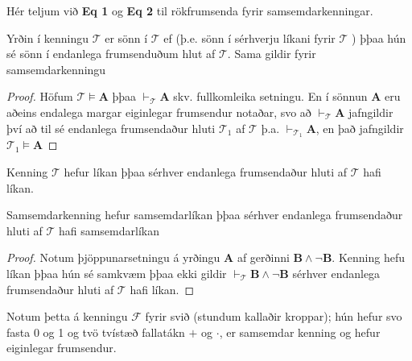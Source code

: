 \documentclass[12pt]{article}
\begin{document}
\begin{ath}
 Hér teljum við \textbf{Eq 1} og \textbf{Eq 2} til rökfrumsenda fyrir
 samsemdarkenningar.
\end{ath}

\begin{setn}[Þjöppunarsetning]
  Yrðin í kenningu $\mathcal{T}$ er sönn í $\mathcal{T}$ ef (þ.e. sönn
  í sérhverju líkani fyrir $\mathcal{T}$ ) þþaa
  hún sé sönn í endanlega frumsenduðum hlut af $\mathcal{T}$.
  Sama gildir fyrir samsemdarkenningu
\end{setn}

\begin{proof}
  Höfum $\mathcal{T} \models \mathbf{A}$ þþaa $\vdash_{\mathcal{T}} \mathbf{A}$
  skv. fullkomleika setningu. En í sönnun $\mathbf{A}$ eru aðeins endalega
  margar eiginlegar frumsendur notaðar, svo að $\vdash_{\mathcal{T}} \mathbf{A}$
  jafngildir því að til sé endanlega frumsendaður hluti $\mathcal{T}_{1}$
  af $\mathcal{T}$ þ.a. $\vdash_{\mathcal{T}_1} \mathbf{A}$, en það jafngildir
  $\mathcal{T}_1 \models \mathbf{A}$
\end{proof}
\begin{setn}[Fylgisetn]
  Kenning $\mathcal{T}$ hefur líkan þþaa sérhver endanlega
  frumsendaður hluti af $\mathcal{T}$ hafi líkan.
  
  Samsemdarkenning hefur samsemdarlíkan þþaa sérhver endanlega frumsendaður
  hluti af $\mathcal{T}$ hafi samsemdarlíkan
\end{setn}

\begin{proof}
  Notum þjöppunarsetningu á yrðingu $\mathbf{A}$ af gerðinni
  $\mathbf{B} \wedge \lnot \mathbf{B}$. Kenning hefu líkan þþaa
  hún sé samkvæm þþaa ekki gildir $\vdash_{\mathcal{T}} \mathbf{B} \wedge \lnot \mathbf{B}$
  sérhver endanlega frumsendaður hluti af $\mathcal{T}$ hafi líkan.
\end{proof}

\begin{daemi}
  Notum þetta á kenningu $\mathcal{F}$ fyrir svið (stundum kallaðir kroppar);
  hún hefur svo fasta 0 og 1 og tvö tvístæð fallatákn $+$ og $\cdot$, er samsemdar
  kenning og hefur eiginlegar frumsendur.
\end{daemi}
\end{document}
